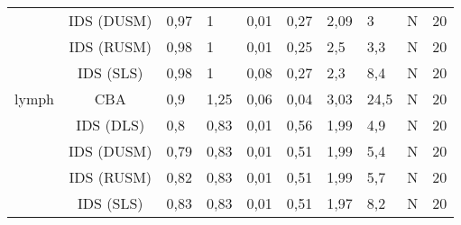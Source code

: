 \begin{tabular}{ccllllllll}
      & IDS (DUSM) &               0,97 &                               1 &                            0,01 &                              0,27 &                              2,09 &                             3 &                            N &                         20 \\
      & IDS (RUSM) &               0,98 &                               1 &                            0,01 &                              0,25 &                               2,5 &                           3,3 &                            N &                         20 \\
      & IDS (SLS) &               0,98 &                               1 &                            0,08 &                              0,27 &                               2,3 &                           8,4 &                            N &                         20 \\
lymph & CBA &                0,9 &                            1,25 &                            0,06 &                              0,04 &                              3,03 &                          24,5 &                            N &                         20 \\
      & IDS (DLS) &                0,8 &                            0,83 &                            0,01 &                              0,56 &                              1,99 &                           4,9 &                            N &                         20 \\
      & IDS (DUSM) &               0,79 &                            0,83 &                            0,01 &                              0,51 &                              1,99 &                           5,4 &                            N &                         20 \\
      & IDS (RUSM) &               0,82 &                            0,83 &                            0,01 &                              0,51 &                              1,99 &                           5,7 &                            N &                         20 \\
      & IDS (SLS) &               0,83 &                            0,83 &                            0,01 &                              0,51 &                              1,97 &                           8,2 &                            N &                         20 \\
\bottomrule
\end{tabular}
